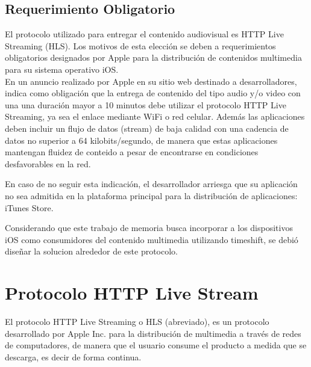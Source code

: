\subsection{Requerimiento Obligatorio}
	El protocolo utilizado para entregar el contenido audiovisual es HTTP Live Streaming (HLS). Los motivos de esta elección se deben a requerimientos obligatorios designados por Apple para la distribución de contenidos multimedia para su sistema operativo iOS.\\
	
	En un anuncio realizado por Apple en su sitio web destinado a desarrolladores, indica como obligación que la entrega de contenido del tipo audio y/o video con una una duración mayor a 10 minutos debe utilizar el protocolo HTTP Live Streaming, ya sea el enlace mediante WiFi o red celular. Además las aplicaciones deben incluir un flujo de datos (stream) de baja calidad con una cadencia de datos no superior a 64 kilobits/segundo, de manera que estas aplicaciones mantengan fluidez de conteido a pesar de encontrarse en condiciones desfavorables en la red.
	
	En caso de no seguir esta indicación, el desarrollador arriesga que su aplicación no sea admitida en la plataforma principal para la distribución de aplicaciones: iTunes Store.

	Considerando que este trabajo de memoria busca incorporar a los dispositivos iOS como consumidores del contenido multimedia utilizando timeshift, se debió diseñar la solucion alrededor de este protocolo.


\section{Protocolo HTTP Live Stream}

El protocolo HTTP Live Streaming o HLS (abreviado), es un protocolo desarrollado por Apple Inc. para la distribución de multimedia a través de redes de computadores, de manera que el usuario consume el producto a medida que se descarga, es decir de forma continua.\\

